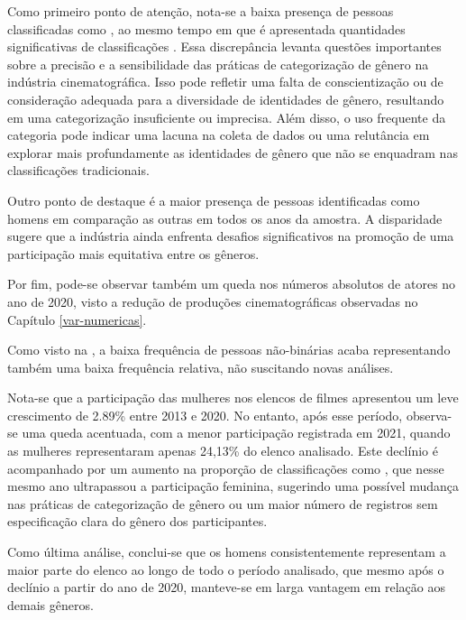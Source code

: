 Como primeiro ponto de atenção, nota-se a baixa presença de pessoas classificadas como , ao mesmo tempo em que é apresentada quantidades significativas de classificações . Essa discrepância levanta questões importantes sobre a precisão e a sensibilidade das práticas de categorização de gênero na indústria cinematográfica. Isso pode refletir uma falta de conscientização ou de consideração adequada para a diversidade de identidades de gênero, resultando em uma categorização insuficiente ou imprecisa. Além disso, o uso frequente da categoria  pode indicar uma lacuna na coleta de dados ou uma relutância em explorar mais profundamente as identidades de gênero que não se enquadram nas classificações tradicionais.

Outro ponto de destaque é a maior presença de pessoas identificadas como homens em comparação as outras em todos os anos da amostra. A disparidade sugere que a indústria ainda enfrenta desafios significativos na promoção de uma participação mais equitativa entre os gêneros.

Por fim, pode-se observar também um queda nos números absolutos de atores no ano de 2020, visto a redução de produções cinematográficas observadas no Capítulo \ref{var-numericas}.

%

Como visto na , a baixa frequência de pessoas não-binárias acaba representando também uma baixa frequência relativa, não suscitando novas análises.

Nota-se que a participação das mulheres nos elencos de filmes apresentou um leve crescimento de 2.89\% entre 2013 e 2020. No entanto, após esse período, observa-se uma queda acentuada, com a menor participação registrada em 2021, quando as mulheres representaram apenas 24,13\% do elenco analisado. Este declínio é acompanhado por um aumento na proporção de classificações como , que nesse mesmo ano ultrapassou a participação feminina, sugerindo uma possível mudança nas práticas de categorização de gênero ou um maior número de registros sem especificação clara do gênero dos participantes.

Como última análise, conclui-se que os homens consistentemente representam a maior parte do elenco ao longo de todo o período analisado, que mesmo após o declínio a partir do ano de 2020, manteve-se em larga vantagem em relação aos demais gêneros.

